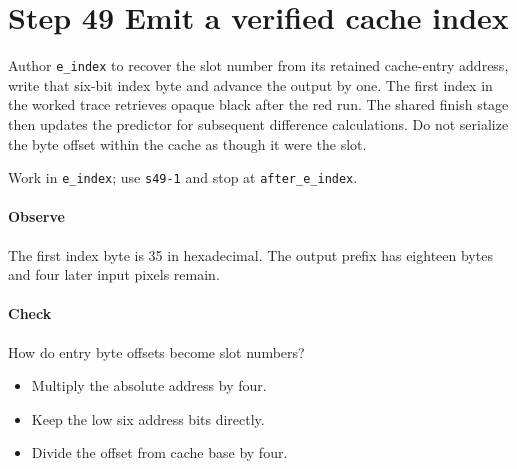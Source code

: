 \section{Step 49 Emit a verified cache index}\label{qoi-s49}
Author \texttt{e\_index} to recover the slot number from its retained cache-entry address, write that six-bit index byte and advance the output by one. The first index in the worked trace retrieves opaque black after the red run. The shared finish stage then updates the predictor for subsequent difference calculations. Do not serialize the byte offset within the cache as though it were the slot.

Work in \texttt{e\_index}; use \texttt{s49-1} and stop at \texttt{after\_e\_index}.

\paragraph{Observe} The first index byte is 35 in hexadecimal. The output prefix has eighteen bytes and four later input pixels remain.

\paragraph{Check} How do entry byte offsets become slot numbers?
\begin{itemize}
  \item[A.] Multiply the absolute address by four.
  \item[B.] Keep the low six address bits directly.
  \item[C.] Divide the offset from cache base by four.
\end{itemize}
